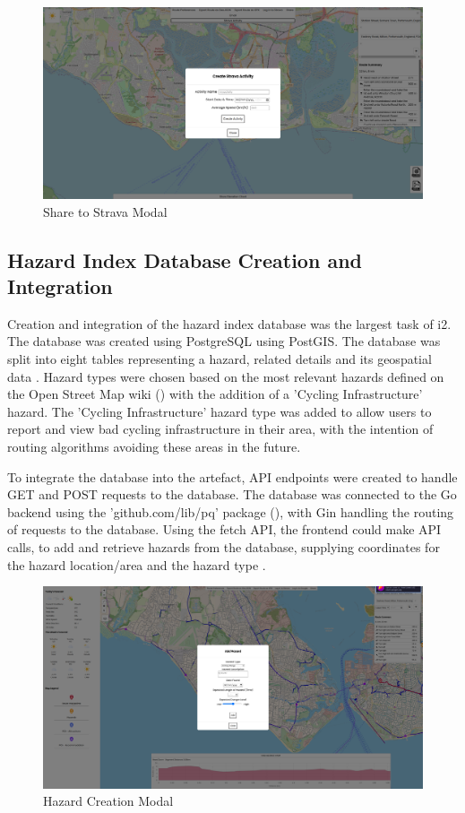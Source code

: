 \begin{figure}[!ht]
  \centering
  \includegraphics[width=425px]{figures/Progress Images/Iteration-2/SR18/SR18 Strava Modal.png}
  \caption{Share to Strava Modal}
  \label{fig:strava-modal}
\end{figure}


\subsection{Hazard Index Database Creation and Integration}
\label{iteration2:hazard-index}

Creation and integration of the hazard index database was the largest task of i2. The database was created using PostgreSQL using PostGIS. The database was split into eight tables representing a hazard, related details and its geospatial data . Hazard types were chosen based on the most relevant hazards defined on the Open Street Map wiki (\cite{noauthor_keyhazard_nodate}) with the addition of a 'Cycling Infrastructure' hazard. The 'Cycling Infrastructure' hazard type was added to allow users to report and view bad cycling infrastructure in their area, with the intention of routing algorithms avoiding these areas in the future.

To integrate the database into the artefact, API endpoints were created to handle GET and POST requests to the database. The database was connected to the Go backend using the 'github.com/lib/pq' package (\cite{noauthor_pq_nodate}), with Gin handling the routing of requests to the database. Using the fetch API, the frontend could make API calls, to add and retrieve hazards from the database, supplying coordinates for the hazard location/area and the hazard type .

\begin{figure}[!ht]
  \centering
  \includegraphics[width=425px]{figures/Progress Images/Iteration-2/SR32-37/sr32-add-hazard-point.png}
  \caption{Hazard Creation Modal}
  \label{fig:hazard-creation}
\end{figure}

